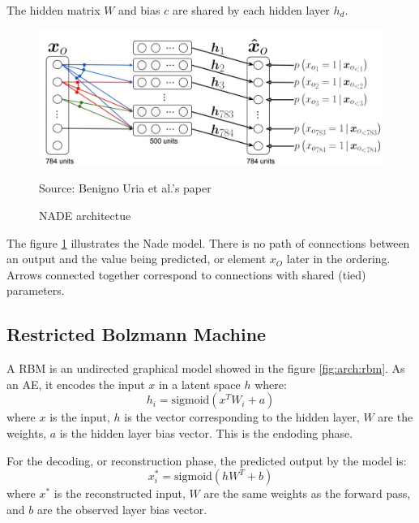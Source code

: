\documentclass[12pt]{report}
\begin{document}
The hidden matrix $W$ and bias $c$ are shared by each hidden layer $h_{d}$.
\begin{figure}[ht]
    \centering
    \includegraphics[width=0.75 \textwidth]{images/nn/architectures/nade_architecture.jpg}
    \caption{NADE architectue}
    Source: Benigno Uria et al.'s paper \cite{uria_neural_2016}
    \label{fig:arch:nade}
\end{figure}
The figure \ref{fig:arch:nade} illustrates the Nade model.
There is no path of connections between an output and the value being predicted, or element $x_O$ later in the ordering.
Arrows connected together correspond to connections with shared (tied) parameters.

\subsection{Restricted Bolzmann Machine}
\label{sec:back:rbm}

A RBM is an undirected graphical model \cite{noauthor_restricted_2018, montufar_restricted_2018, salakhutdinov_restricted_2007, fischer_introduction_2012} showed in the figure \ref{fig:arch:rbm}.
As an AE, it encodes the input $x$ in a latent space $h$ where:
\begin{equation}
    h_{i} = \text{sigmoid}(x^{T} W_{i} + a)
\end{equation}
where $x$ is the input, $h$ is the vector corresponding to the hidden layer, $W$ are the weights, $a$ is the hidden layer bias vector.
This is the endoding phase.

For the decoding, or reconstruction phase, the predicted output by the model is:
\begin{equation}
    x^{*}_{i} = \text{sigmoid}(h W^{T} + b)
\end{equation}
where $x^{*}$ is the reconstructed input, $W$ are the same weights as the forward pass, and $b$ are the observed layer bias vector.
\end{document}
